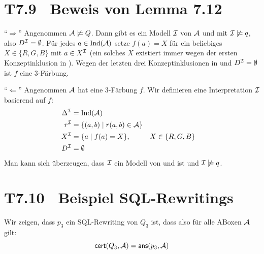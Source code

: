 \documentclass[fontsize=11pt, twoside=false, numbers=autoenddot]{scrbook}
\begin{document}
\section*{T7.9~ Beweis von Lemma 7.12}

``$\Rightarrow$'' Angenommen $\mathcal{A}\not\models Q$. Dann gibt es ein
Modell $\mathcal{I}$ von $\mathcal{A}$ und \Tmc mit $\mathcal{I}\not\models q$, also
$D^\mathcal{I}=\emptyset$. Für jedes $a\in\text{Ind}(\mathcal{A})$ setze
$f(a)=X$ für ein beliebiges $X\in\{R,G,B\}$ mit $a\in X^\mathcal{I}$ (ein
solches $X$ existiert immer wegen der ersten Konzeptinklusion in
\Tmc). Wegen der letzten drei Konzeptinklusionen in \Tmc und
$D^\mathcal{I}=\emptyset$ ist $f$ eine $3$-Färbung. 

\smallskip
``$\Leftarrow$'' Angenommen $\mathcal{A}$ hat eine $3$-Färbung $f$. Wir
definieren eine Interpretation $\mathcal{I}$ basierend auf $f$:
%
\begin{align*}
  \Delta^\mathcal{I} & = \text{Ind}(\mathcal{A}) \\
  r^\mathcal{I} & = \{(a,b)\mid r(a,b)\in \mathcal{A}\} \\
  X^\mathcal{I} & = \{a\mid f(a)=X\}, && X\in \{R,G,B\} \\
  D^\mathcal{I} & = \emptyset
\end{align*}
%
Man kann sich überzeugen, dass $\mathcal{I}$ ein Modell von \Tmc und \Amc ist
und $\mathcal{I}\not\models q$.

\newcommand{\BspRewritings}{T7.10}
\section*{\hypertarget{BspRewritings}{\BspRewritings}~ Beispiel SQL-Rewritings}

Wir zeigen, dass $p_3$ ein SQL-Rewriting von $Q_3$ ist, dass also für
alle ABoxen $\mathcal{A}$ gilt:
\[
  \textsf{cert}(Q_3,\mathcal{A}) = \textsf{ans}(p_3,\mathcal{A})
\]
\end{document}

